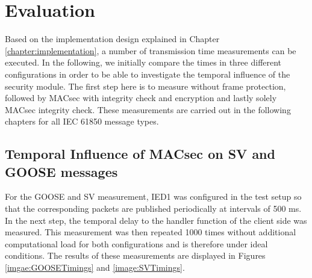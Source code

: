 \documentclass[conference, onecolumn, a4paper]{IEEEtran}
\begin{document}
\section{Evaluation}
\label{chapter:evaluation}
\noindent Based on the implementation design explained in Chapter \ref{chapter:implementation}, a number of transmission time measurements can be 
executed. In the following, we initially compare the times in three different configurations in order to be able to investigate the temporal influence 
of the security module. The first step here is to measure without frame protection, followed by MACsec with integrity check and encryption and lastly 
solely MACsec integrity check. These measurements are carried out in the following chapters for all IEC 61850 message types.

\subsection{Temporal Influence of MACsec on SV and GOOSE messages}
\label{subchapter:EvalGOOSESV}
\noindent For the GOOSE and SV measurement, IED1 was configured in the test setup so that the corresponding packets are published periodically at 
intervals of 500 ms. In the next step, the temporal delay to the handler function of the client side was measured. This measurement was then repeated 
1000 times without additional computational load for both configurations and is therefore under ideal conditions. The results of these measurements are 
displayed in Figures \ref{imgae:GOOSETimings} and \ref{image:SVTimings}.
\end{document}

